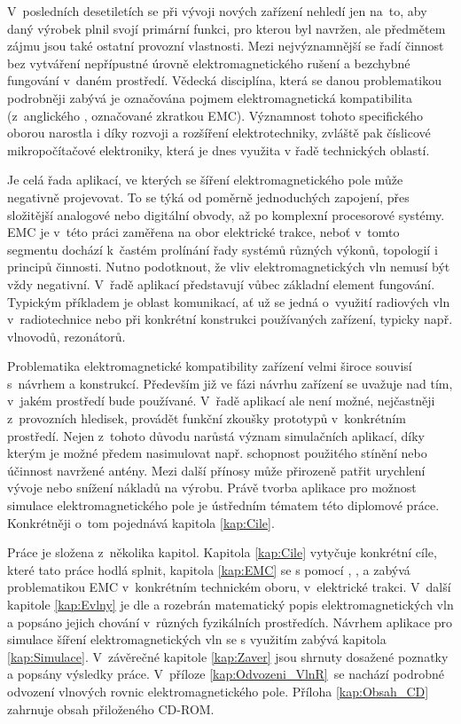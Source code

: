 
V~posledních desetiletích se při vývoji nových zařízení nehledí jen na~to, aby daný výrobek plnil svojí primární funkci, pro kterou byl navržen, ale předmětem zájmu jsou také ostatní provozní vlastnosti. Mezi nejvýznamnější se řadí činnost bez vytváření nepřípustné úrovně elektromagnetického rušení a bezchybné fungování v~daném prostředí. Vědecká disciplína, která se danou problematikou podrobněji zabývá je označována pojmem elektromagnetická kompatibilita (z~anglického , označované zkratkou EMC). Významnost tohoto specifického oborou narostla i díky rozvoji a rozšíření elektrotechniky, zvláště pak číslicové mikropočítačové elektroniky, která je dnes využita v řadě technických oblastí.

Je celá řada aplikací, ve kterých se šíření elektromagnetického pole může negativně projevovat. To se týká od poměrně jednoduchých zapojení, přes složitější analogové nebo digitální obvody, až po komplexní procesorové systémy. EMC je v~této práci zaměřena na obor elektrické trakce, neboť v~tomto segmentu dochází k~častém prolínání řady systémů různých výkonů, topologií i principů činnosti. Nutno podotknout, že vliv elektromagnetických vln nemusí být vždy negativní. V~řadě aplikací představují vůbec základní element fungování. Typickým příkladem je oblast komunikací, ať už se jedná o~využití radiových vln v~radiotechnice nebo při konkrétní konstrukci používaných zařízení, typicky např. vlnovodů, rezonátorů.

Problematika elektromagnetické kompatibility zařízení velmi široce souvisí s~návrhem a konstrukcí. Především již ve fázi návrhu zařízení se uvažuje nad tím, v~jakém prostředí bude používané. V~řadě aplikací ale není možné, nejčastněji z~provozních hledisek, provádět funkční zkoušky prototypů v~konkrétním prostředí. Nejen z~tohoto důvodu narůstá význam simulačních aplikací, díky kterým je možné předem nasimulovat např. schopnost použitého stínění nebo účinnost navržené antény. Mezi další přínosy může přirozeně patřit urychlení vývoje nebo snížení nákladů na výrobu. Právě tvorba aplikace pro možnost simulace elektromagnetického pole je ústředním tématem této diplomové práce. Konkrétněji o~tom pojednává kapitola \ref{kap:Cile}.

Práce je složena z~několika kapitol. Kapitola \ref{kap:Cile} vytyčuje konkrétní cíle, které tato práce hodlá splnit, kapitola \ref{kap:EMC} se s pomocí \cite{emc_trakce}, \cite{nfr}, \cite{emc_encyklopedie} a \cite{csn} zabývá problematikou EMC v~konkrétním technickém oboru, v~elektrické trakci. V~další kapitole \ref{kap:Evlny} je dle \cite{emp} a \cite{umt} rozebrán matematický popis elektromagnetických vln a popsáno jejich chování v~různých fyzikálních prostředích. Návrhem aplikace pro simulace šíření elektromagnetických vln se s využitím \cite{hpfem} zabývá kapitola \ref{kap:Simulace}. V~závěrečné kapitole \ref{kap:Zaver} jsou shrnuty dosažené poznatky a popsány výsledky práce. V~příloze \ref{kap:Odvozeni_VlnR}~se nachází podrobné odvození vlnových rovnic elektromagnetického pole. Příloha \ref{kap:Obsah_CD} zahrnuje obsah přiloženého CD-ROM.

